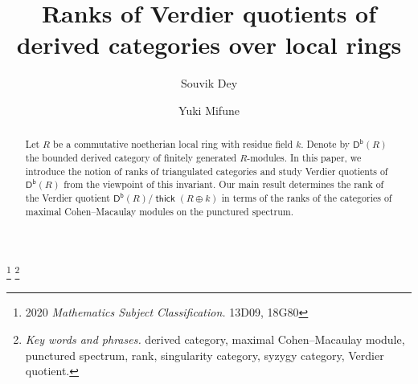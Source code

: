 \documentclass[10pt]{amsart}
\theoremstyle{definition}
\theoremstyle{remark}
\numberwithin{equation}{thm}
\begin{document}
\title{Ranks of Verdier quotients of derived categories over local rings} 
\author{Souvik Dey}
\address[Dey]{Department of Mathematical Sciences, University of Arkansas, 850 West Dickson Street, Fayetteville, Arkansas 72701, USA}
\author{Yuki Mifune}
\address[Mifune]{Graduate School of Mathematics, Nagoya University, Furocho, Chikusaku, Nagoya 464-8602, Japan}
\thanks{2020 {\em Mathematics Subject Classification.} 13D09, 18G80}
\thanks{{\em Key words and phrases.} derived category, maximal Cohen--Macaulay module, punctured spectrum, rank, singularity category, syzygy category, Verdier quotient.}
\begin{abstract}
Let $R$ be a commutative noetherian local ring with residue field $k$.
Denote by $\operatorname{\mathsf{D^b}}(R)$ the bounded derived category of finitely generated $R$-modules.
In this paper, we introduce the notion of ranks of triangulated categories and study Verdier quotients of $\operatorname{\mathsf{D^b}}(R)$ from the viewpoint of this invariant.
Our main result determines the rank of the Verdier quotient $\operatorname{\mathsf{D^b}}(R)/\operatorname{\mathsf{thick}}(R\oplus k)$ in terms of the ranks of the categories of maximal Cohen--Macaulay modules on the punctured spectrum.
\end{abstract}
\maketitle
\end{document}
